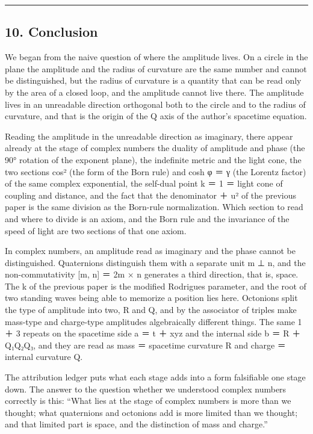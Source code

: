 \documentclass[
  a4paper,
]{article}
\begin{document}
\begin{center}\rule{0.5\linewidth}{0.5pt}\end{center}

\subsection{10. Conclusion}\label{conclusion}

We began from the naive question of where the amplitude lives. On a
circle in the plane the amplitude and the radius of curvature are the
same number and cannot be distinguished, but the radius of curvature is
a quantity that can be read only by the area of a closed loop, and the
amplitude cannot live there. The amplitude lives in an unreadable
direction orthogonal both to the circle and to the radius of curvature,
and that is the origin of the Q axis of the author's spacetime equation.

Reading the amplitude in the unreadable direction as imaginary, there
appear already at the stage of complex numbers the duality of amplitude
and phase (the 90° rotation of the exponent plane), the indefinite
metric and the light cone, the two sections cos² (the form of the Born
rule) and cosh φ ＝ γ (the Lorentz factor) of the same complex
exponential, the self-dual point \textbar k\textbar{} ＝ 1 ＝ light cone
of coupling and distance, and the fact that the denominator  ＋
u\textbar² of the previous paper is the same division as the Born-rule
normalization. Which section to read and where to divide is an axiom,
and the Born rule and the invariance of the speed of light are two
sections of that one axiom.

In complex numbers, an amplitude read as imaginary and the phase cannot
be distinguished. Quaternions distinguish them with a separate unit m ⊥
n, and the non-commutativity {[}m, n{]} ＝ 2m × n generates a third
direction, that is, space. The k of the previous paper is the modified
Rodrigues parameter, and the root of two standing waves being able to
memorize a position lies here. Octonions split the type of amplitude
into two, R and Q, and by the associator of triples make mass-type and
charge-type amplitudes algebraically different things. The same 1 ＋ 3
repeats on the spacetime side a ＝ t ＋ xyz and the internal side b ＝ R
＋ Q₁Q₂Q₃, and they are read as mass ＝ spacetime curvature R and charge
＝ internal curvature Q.

The attribution ledger puts what each stage adds into a form falsifiable
one stage down. The answer to the question whether we understood complex
numbers correctly is this: ``What lies at the stage of complex numbers
is more than we thought; what quaternions and octonions add is more
limited than we thought; and that limited part is space, and the
distinction of mass and charge.''
\end{document}

